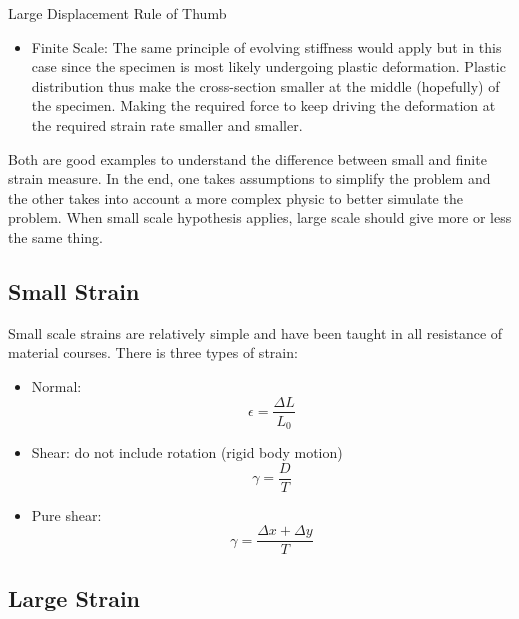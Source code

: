 \begin{keyconcept}{Large Displacement Rule of Thumb}
\begin{itemize}
        
        \item Finite Scale: The same principle of evolving stiffness would apply but in this case since the specimen is most likely undergoing plastic deformation. Plastic distribution thus make the cross-section smaller at the middle (hopefully) of the specimen. Making the required force to keep driving the deformation at the required strain rate smaller and smaller.
 
        \end{itemize}
    Both are good examples to understand the difference between small and finite strain measure. In the end, one takes assumptions to simplify the problem and the other takes into account a more complex physic to better simulate the problem. When small scale hypothesis applies, large scale should give more or less the same thing.
    
\end{keyconcept}

\subsection{Small Strain}
\label{subsec:smallstrain}
Small scale strains are relatively simple and have been taught in all resistance of material courses. There is three types of strain:
\begin{itemize}
    \item Normal:
    \begin{equation}
        \label{eq:normalstrain}
        \epsilon = \dfrac{\Delta L}{L_0}
    \end{equation}
    

    \item Shear: do not include rotation (rigid body motion)
    \begin{equation}
        \label{eq:shearstrain}
        \gamma = \dfrac{D}{T}
    \end{equation}
    
        
    \item Pure shear:
    \begin{equation}
        \label{eq:pureshearstrain}
        \gamma = \dfrac{\Delta x + \Delta y}{T}
    \end{equation}
    
    
\end{itemize}


\subsection{Large Strain}
\label{subsec:largestrain}
